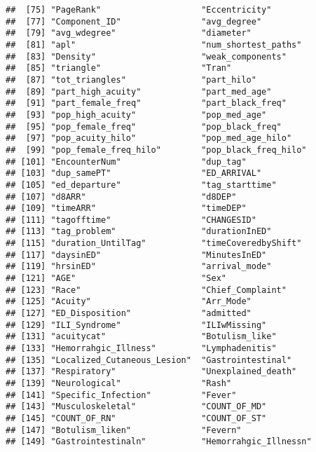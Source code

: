 \documentclass[]{elsarticle} %
\begin{document}
\begin{verbatim}
##  [75] "PageRank"                    "Eccentricity"               
##  [77] "Component_ID"                "avg_degree"                 
##  [79] "avg_wdegree"                 "diameter"                   
##  [81] "apl"                         "num_shortest_paths"         
##  [83] "Density"                     "weak_components"            
##  [85] "triangle"                    "Tran"                       
##  [87] "tot_triangles"               "part_hilo"                  
##  [89] "part_high_acuity"            "part_med_age"               
##  [91] "part_female_freq"            "part_black_freq"            
##  [93] "pop_high_acuity"             "pop_med_age"                
##  [95] "pop_female_freq"             "pop_black_freq"             
##  [97] "pop_acuity_hilo"             "pop_med_age_hilo"           
##  [99] "pop_female_freq_hilo"        "pop_black_freq_hilo"        
## [101] "EncounterNum"                "dup_tag"                    
## [103] "dup_samePT"                  "ED_ARRIVAL"                 
## [105] "ed_departure"                "tag_starttime"              
## [107] "d8ARR"                       "d8DEP"                      
## [109] "timeARR"                     "timeDEP"                    
## [111] "tagofftime"                  "CHANGESID"                  
## [113] "tag_problem"                 "durationInED"               
## [115] "duration_UntilTag"           "timeCoveredbyShift"         
## [117] "daysinED"                    "MinutesInED"                
## [119] "hrsinED"                     "arrival_mode"               
## [121] "AGE"                         "Sex"                        
## [123] "Race"                        "Chief_Complaint"            
## [125] "Acuity"                      "Arr_Mode"                   
## [127] "ED_Disposition"              "admitted"                   
## [129] "ILI_Syndrome"                "ILIwMissing"                
## [131] "acuitycat"                   "Botulism_like"              
## [133] "Hemorrahgic_Illness"         "Lymphadenitis"              
## [135] "Localized_Cutaneous_Lesion"  "Gastrointestinal"           
## [137] "Respiratory"                 "Unexplained_death"          
## [139] "Neurological"                "Rash"                       
## [141] "Specific_Infection"          "Fever"                      
## [143] "Musculoskeletal"             "COUNT_OF_MD"                
## [145] "COUNT_OF_RN"                 "COUNT_OF_ST"                
## [147] "Botulism_liken"              "Fevern"                     
## [149] "Gastrointestinaln"           "Hemorrahgic_Illnessn"       

\end{verbatim}
\end{document}
